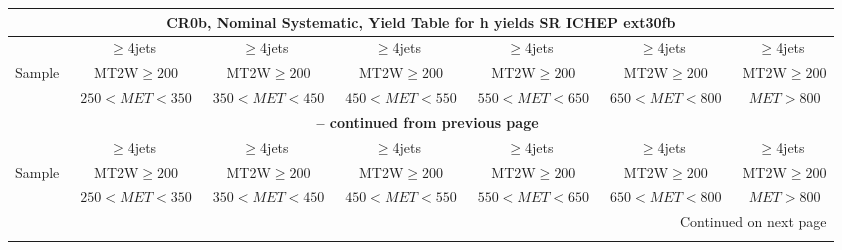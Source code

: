 \documentclass{article}
\begin{document}
\begin{longtable}{|l|c|c|c|c|c|c|} 
 
\multicolumn{7}{c}{ CR0b, Nominal Systematic, Yield Table for h yields SR ICHEP ext30fb }\\* \hline 
  & $\ge$4jets  & $\ge$4jets  & $\ge$4jets  & $\ge$4jets  & $\ge$4jets  & $\ge$4jets \\* 
Sample  & ~MT2W$\ge200$  & ~MT2W$\ge200$  & ~MT2W$\ge200$  & ~MT2W$\ge200$  & ~MT2W$\ge200$  & ~MT2W$\ge200$ \\* 
  & ~$250<MET<350$  & ~$350<MET<450$  & ~$450<MET<550$  & ~$550<MET<650$  & ~$650<MET<800$  & ~$MET>800$ \\* 
\hline \hline 
\endfirsthead 
 
\multicolumn{7}{c}{{\bfseries \tablename\ \thetable{} -- continued from previous page}}\\* \hline 
  & $\ge$4jets  & $\ge$4jets  & $\ge$4jets  & $\ge$4jets  & $\ge$4jets  & $\ge$4jets \\* 
Sample  & ~MT2W$\ge200$  & ~MT2W$\ge200$  & ~MT2W$\ge200$  & ~MT2W$\ge200$  & ~MT2W$\ge200$  & ~MT2W$\ge200$ \\* 
  & ~$250<MET<350$  & ~$350<MET<450$  & ~$450<MET<550$  & ~$550<MET<650$  & ~$650<MET<800$  & ~$MET>800$ \\* 
\hline \hline 
\endhead 
 
\multicolumn{7}{|r|}{{Continued on next page}}\\* \hline 
\endfoot 
 
 
\endlastfoot 
 

\end{longtable}
\end{document}
